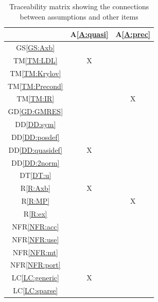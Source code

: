 \documentclass[12pt]{article}
\newcommand{\dref}[1]{GD\ref{#1}}
\newcommand{\ddref}[1]{DD\ref{#1}}
\newcommand{\dtref}[1]{DT\ref{#1}}
\newcommand{\tref}[1]{TM\ref{#1}}
\newcommand{\aref}[1]{A\ref{#1}}
\newcommand{\gsref}[1]{GS\ref{#1}}
\newcommand{\rref}[1]{R\ref{#1}}
\newcommand{\nfrref}[1]{NFR\ref{#1}}
\newcommand{\lcref}[1]{LC\ref{#1}}
\begin{document}
\begin{table}[h!]
  \centering
  \begin{tabular}{|c|c|c|}                                      \hline
                        & \aref{A:quasi} & \aref{A:prec} \\ \hline
    \gsref{GS:Axb}      &                &               \\ \hline
    \tref{TM:LDL}       & X              &               \\ \hline
    \tref{TM:Krylov}    &                &               \\ \hline
    \tref{TM:Precond}   &                &               \\ \hline
    \tref{TM:IR}        &                & X             \\ \hline
    \dref{GD:GMRES}     &                &               \\ \hline
    \ddref{DD:sym}      &                &               \\ \hline
    \ddref{DD:posdef}   &                &               \\ \hline
    \ddref{DD:quasidef} & X              &               \\ \hline
    \ddref{DD:2norm}    &                &               \\ \hline
    \dtref{DT:u}        &                &               \\ \hline
    \rref{R:Axb}        & X              &               \\ \hline
    \rref{R:MP}         &                & X             \\ \hline
    \rref{R:ex}         &                &               \\ \hline
    \nfrref{NFR:acc}    &                &               \\ \hline
    \nfrref{NFR:use}    &                &               \\ \hline
    \nfrref{NFR:mt}     &                &               \\ \hline
    \nfrref{NFR:port}   &                &               \\ \hline
    \lcref{LC:generic}  & X              &               \\ \hline
    \lcref{LC:sparse}   &                &               \\ \hline
  \end{tabular}
  \caption{Traceability matrix showing the connections between assumptions and other items}
  \label{Table:A_trace}
\end{table}
\end{document}
